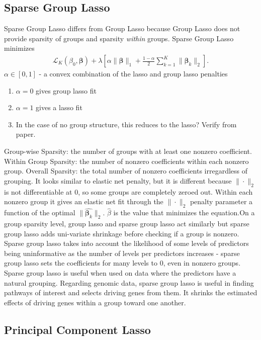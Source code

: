 \documentclass[10pt]{article}
\begin{document}
\subsection{Sparse Group Lasso}
Sparse Group Lasso differs from Group Lasso because Group Lasso does not provide sparsity of groups and sparsity \emph{within} groups. Sparse Group Lasso minimizes
    \begin{align}
    \label{sglasso}
        \mathcal{L}_K(\beta_0, \bm{\beta}) + \lambda \left[ \alpha \| \bm{\beta} \|_1  + \frac{1 - \alpha}{2} \sum_{k=1}^K \| \bm{\beta}_k \|_2 \right].
    \end{align}
$\alpha \in [0,1]$ -  a convex combination of the lasso and group lasso penalties
\begin{enumerate}
    \item $\alpha = 0$ gives group lasso fit
    \item $\alpha = 1$ gives a lasso fit
    \item In the case of no group structure, this reduces to the lasso? Verify from paper.
\end{enumerate}
Group-wise Sparsity: the number of groups with at least one nonzero coefficient. Within Group Sparsity: the number of nonzero coefficients within each nonzero group. Overall Sparsity: the total number of nonzero coefficients irregardless of grouping. It looks similar to elastic net penalty, but it is different because $\|\cdot\|_{2}$ is not differentiable at $0$, so some groups are completely zeroed out. Within each nonzero group it gives an elastic net fit through the $\|\cdot\|_{2}$ penalty parameter a function of the optimal $\|\hat{\bm{\beta}_{k}}\|_{2}$. $\hat{\beta}$ is the value that minimizes the equation.On a group sparsity level, group lasso and sparse group lasso act similarly but sparse group lasso adds uni-variate shrinkage before checking if a group is nonzero. Sparse group lasso takes into account the likelihood of some levels of predictors being uninformative as the number of levels per predictors increases - sparse group lasso sets the coefficients for many levels to $0$, even in nonzero groups. Sparse group lasso is useful when used on data where the predictors have a natural grouping. Regarding genomic data, sparse group lasso is useful in finding pathways of interest and selects driving genes from them. It shrinks the estimated effects of driving genes within a group toward one another.


\subsection{Principal Component Lasso}
\end{document}
